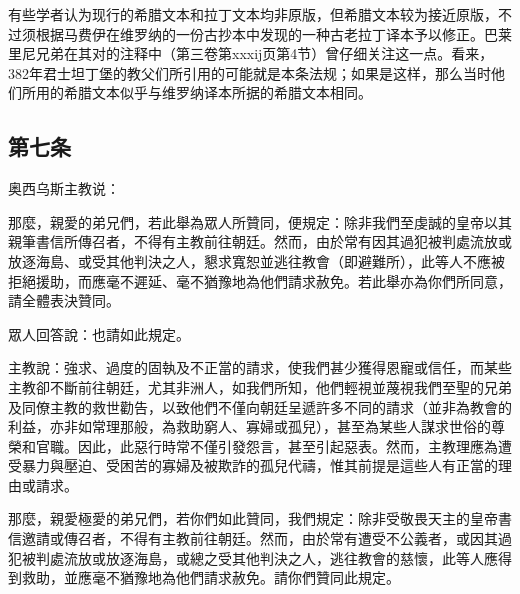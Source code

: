 有些学者认为现行的希腊文本和拉丁文本均非原版，但希腊文本较为接近原版，不过须根据马费伊在维罗纳的一份古抄本中发现的一种古老拉丁译本予以修正。巴莱里尼兄弟在其对的注释中（第三卷第xxxij页第4节）曾仔细关注这一点。看来，382年君士坦丁堡的教父们所引用的可能就是本条法规；如果是这样，那么当时他们所用的希腊文本似乎与维罗纳译本所据的希腊文本相同。\par


\subsection{第七条}

奥西乌斯主教说：\par

那麼，親愛的弟兄們，若此舉為眾人所贊同，便規定：除非我們至虔誠的皇帝以其親筆書信所傳召者，不得有主教前往朝廷。然而，由於常有因其過犯被判處流放或放逐海島、或受其他判決之人，懇求寬恕並逃往教會（即避難所），此等人不應被拒絕援助，而應毫不遲延、毫不猶豫地為他們請求赦免。若此舉亦為你們所同意，請全體表決贊同。\par

眾人回答說：也請如此規定。\par

主教說：強求、過度的固執及不正當的請求，使我們甚少獲得恩寵或信任，而某些主教卻不斷前往朝廷，尤其非洲人，如我們所知，他們輕視並蔑視我們至聖的兄弟及同僚主教的救世勸告，以致他們不僅向朝廷呈遞許多不同的請求（並非為教會的利益，亦非如常理那般，為救助窮人、寡婦或孤兒），甚至為某些人謀求世俗的尊榮和官職。因此，此惡行時常不僅引發怨言，甚至引起惡表。然而，主教理應為遭受暴力與壓迫、受困苦的寡婦及被欺詐的孤兒代禱，惟其前提是這些人有正當的理由或請求。\par

那麼，親愛極愛的弟兄們，若你們如此贊同，我們規定：除非受敬畏天主的皇帝書信邀請或傳召者，不得有主教前往朝廷。然而，由於常有遭受不公義者，或因其過犯被判處流放或放逐海島，或總之受其他判決之人，逃往教會的慈懷，此等人應得到救助，並應毫不猶豫地為他們請求赦免。請你們贊同此規定。\par

